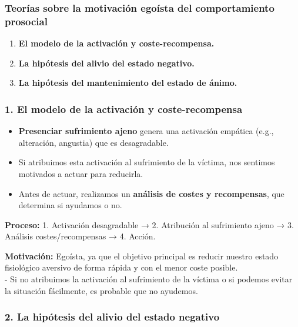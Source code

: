 \documentclass[
]{book}
\providecommand{\tightlist}{%
  \setlength{\itemsep}{0pt}\setlength{\parskip}{0pt}}
\begin{document}
\subsubsection{Teorías sobre la motivación egoísta del comportamiento prosocial}\label{teoruxedas-sobre-la-motivaciuxf3n-egouxedsta-del-comportamiento-prosocial}

\begin{enumerate}
\def\labelenumi{\arabic{enumi}.}
\tightlist
\item
  \textbf{El modelo de la activación y coste-recompensa.}
\item
  \textbf{La hipótesis del alivio del estado negativo.}
\item
  \textbf{La hipótesis del mantenimiento del estado de ánimo.}
\end{enumerate}

\subsubsection{\texorpdfstring{1. \textbf{El modelo de la activación y coste-recompensa}}{1. El modelo de la activación y coste-recompensa}}\label{el-modelo-de-la-activaciuxf3n-y-coste-recompensa}

\begin{itemize}
\tightlist
\item
  \textbf{Presenciar sufrimiento ajeno} genera una activación empática (e.g., alteración, angustia) que es desagradable.\\
\item
  Si atribuimos esta activación al sufrimiento de la víctima, nos sentimos motivados a actuar para reducirla.\\
\item
  Antes de actuar, realizamos un \textbf{análisis de costes y recompensas}, que determina si ayudamos o no.
\end{itemize}

\textbf{Proceso:}
1. Activación desagradable → 2. Atribución al sufrimiento ajeno → 3. Análisis costes/recompensas → 4. Acción.

\textbf{Motivación:} Egoísta, ya que el objetivo principal es reducir nuestro estado fisiológico aversivo de forma rápida y con el menor coste posible.\\
- Si no atribuimos la activación al sufrimiento de la víctima o si podemos evitar la situación fácilmente, es probable que no ayudemos.

\subsubsection{\texorpdfstring{2. \textbf{La hipótesis del alivio del estado negativo}}{2. La hipótesis del alivio del estado negativo}}\label{la-hipuxf3tesis-del-alivio-del-estado-negativo}
\end{document}
